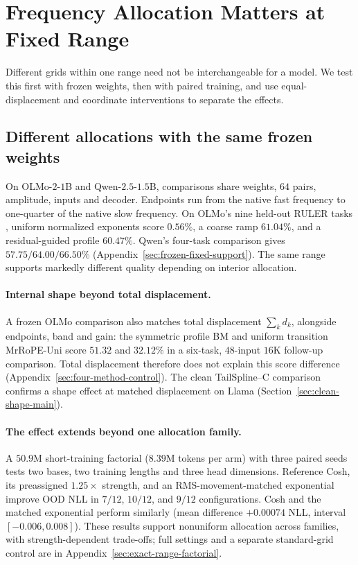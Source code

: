 \section{Frequency Allocation Matters at Fixed Range}
\label{sec:controlled-findings}

Different grids within one range need not be interchangeable for a model.
We test this first with frozen weights, then with paired training, and use
equal-displacement and coordinate interventions to separate the effects.

\subsection{Different allocations with the same frozen weights}
\label{sec:exp-frozen-support}

On OLMo-$2$-$1$B and Qwen-$2.5$-$1.5$B, comparisons share weights, $64$ pairs,
amplitude, inputs and decoder. Endpoints run from the native fast frequency to
one-quarter of the native slow frequency. On OLMo's nine held-out RULER tasks
\citep{hsieh2024ruler}, uniform normalized exponents score $0.56\%$, a coarse
ramp $61.04\%$, and a residual-guided profile $60.47\%$. Qwen's four-task
comparison gives $57.75/64.00/66.50\%$ (Appendix~\ref{sec:frozen-fixed-support}).
The same range supports markedly different quality depending on interior allocation.

\paragraph{Internal shape beyond total displacement.}\label{sec:equal-displacement}
A frozen OLMo comparison also matches total displacement $\sum_k d_k$, alongside endpoints, band and gain: the symmetric profile BM and uniform transition MrRoPE-Uni score $51.32$ and $32.12\%$ in a six-task, $48$-input $16$K follow-up comparison. Total displacement therefore does not explain this score difference (Appendix~\ref{sec:four-method-control}). The clean TailSpline--C comparison confirms a shape effect at matched displacement on Llama (Section~\ref{sec:clean-shape-main}).



\paragraph{The effect extends beyond one allocation family.}\label{sec:factorial}
A $50.9$M short-training factorial ($8.39$M tokens per arm) with three paired seeds tests two bases, two training lengths
and three head dimensions. Reference Cosh, its preassigned $1.25\times$
strength, and an RMS-movement-matched exponential improve OOD NLL in $7/12$,
$10/12$, and $9/12$ configurations. Cosh and the matched exponential perform
similarly (mean difference $+0.00074$ NLL, interval $[-0.006,0.008]$).
These results support nonuniform allocation across families, with strength-dependent
trade-offs; full settings and a separate standard-grid control are in
Appendix~\ref{sec:exact-range-factorial}.

